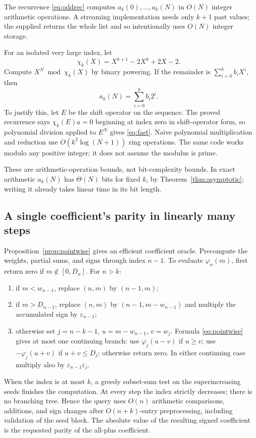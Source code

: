 \documentclass[11pt,letterpaper]{article}
\numberwithin{equation}{section}
\theoremstyle{definition}
\theoremstyle{remark}
\newcommand{\eps}{\varepsilon}
\newcommand{\code}[1]{\texttt{\detokenize{#1}}}
\begin{document}
The recurrence \eqref{eq:oddrec} computes $a_k(0),\ldots,a_k(N)$ in $O(N)$
integer arithmetic operations. A streaming implementation needs only $k+1$
past values; the supplied \code{count_prefix} returns the whole list and so
intentionally uses $O(N)$ integer storage.

For an isolated very large index, let
\[
 \chi_k(X)=X^{k+1}-2X^k+2X-2 .
\]
Compute $X^N\bmod\chi_k(X)$ by binary powering. If the remainder is
$\sum_{i=0}^k b_iX^i$, then
\begin{equation}
 a_k(N)=\sum_{i=0}^k b_i2^i .
 \label{eq:fast}
\end{equation}
To justify this, let $E$ be the shift operator on the sequence. The proved
recurrence says $\chi_k(E)a=0$ beginning at index zero in shift-operator
form, so polynomial division applied to $E^N$ gives \eqref{eq:fast}.
Naive polynomial multiplication and reduction use $O(k^2\log(N+1))$ ring
operations. The same code works modulo any positive integer; it does not
assume the modulus is prime.

These are arithmetic-operation bounds, not bit-complexity bounds. In exact
arithmetic $a_k(N)$ has $\Theta(N)$ bits for fixed $k$, by
Theorem~\ref{thm:asymptotic}; writing it already takes linear time in its
bit length.

\subsection{A single coefficient's parity in linearly many steps}
\label{sec:oracle}

Proposition~\ref{prop:pointwise} gives an efficient coefficient oracle.
Precompute the weights, partial sums, and signs through index $n-1$.
To evaluate $\varphi_n(m)$, first return zero if $m\notin[0,D_n]$. For
$n>k$:
\begin{enumerate}[label=(\arabic*)]
\item if $m<w_{n-1}$, replace $(n,m)$ by $(n-1,m)$;
\item if $m>D_{n-1}$, replace $(n,m)$ by $(n-1,m-w_{n-1})$ and multiply the
accumulated sign by $\eps_{n-1}$;
\item otherwise set $j=n-k-1$, $u=m-w_{n-1}$, $v=w_j$. Formula
\eqref{eq:pointwise} gives at most one continuing branch: use
$\varphi_j(u-v)$ if $u\ge v$; use $-\varphi_j(u+v)$ if $u+v\le D_j$;
otherwise return zero. In either continuing case multiply also by
$\eps_{n-1}\eps_j$.
\end{enumerate}
When the index is at most $k$, a greedy subset-sum test on the
superincreasing seeds finishes the computation. At every step the index
strictly decreases; there is no branching tree. Hence the query uses $O(n)$
arithmetic comparisons, additions, and sign changes after $O(n+k)$-entry
preprocessing, including validation of the seed block. The absolute value of
the resulting signed coefficient is the requested parity of the all-plus
coefficient.
\end{document}
